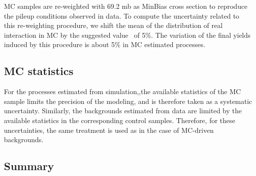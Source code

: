 MC samples are re-weighted with 69.2 mb as MinBias cross section to reproduce the pileup conditions observed in data.
To compute the uncertainty related to this re-weighting procedure, we
shift the mean of the distribution of real interaction in MC by the
suggested value~\cite{twiki:Pileup} of 5\%. 
The variation of the final yields induced by
this procedure is about 5\% in MC estimated processes. 


\subsection{MC statistics}

For the processes estimated from simulation,,the
available statistics of the MC sample limits the precision of the
modeling, and is therefore taken as a systematic
uncertainty. Similarly, the backgrounds estimated from data are
limited by the available statistics in the corresponding control
samples. Therefore, for these uncertainties, the same treatment is
used as in the case of MC-driven backgrounds.

\subsection{Summary}

